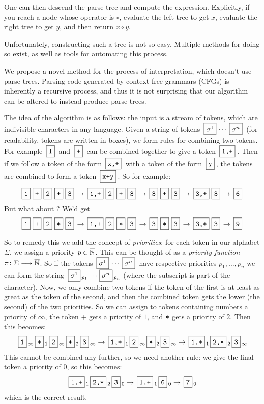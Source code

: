 \documentclass{llncs}
\newcounter{algo}
\begin{document}
One can then descend the parse tree and compute the expression.
Explicitly, if you reach a node whose operator is $\circ$, evaluate the left tree to get $x$, evaluate the right tree to get $y$, and then return $x\circ y$.

Unfortunately, constructing such a tree is not so easy.
Multiple methods for doing so exist, as well as tools for automating this process.

We propose a novel method for the process of interpretation, which doesn't use parse trees.
Parsing code generated by context-free grammars (CFGs) is inherently a recursive process, and thus it is not surprising that our algorithm can be altered to instead produce parse trees.

The idea of the algorithm is as follows: the input is a stream of tokens, which are indivisible characters in any language.
Given a string of tokens $\mb{\sigma^1}\cdots\mb{\sigma^n}$ (for readability, tokens are written in boxes), we form rules for combining two tokens.
For example $\mb{\ttt1}$ and $\mb{\ttt+}$ can be combined together to give a token $\mb{\ttt{1,+}}$.
Then if we follow a token of the form $\mb{\ttt{x,+}}$ with a token of the form $\mb{\ttt y}$, the tokens are combined to form a token $\mb{\ttt{x+y}}$.
So for example:
\[ \mbt{1} \mbt{+} \mbt{2} \mbt{+} \mbt{3} \to \mbt{1,+} \mbt2 \mbt+ \mbt3 \to \mbt{3} \mbt+ \mbt3 \to \mbt{3,+} \mbt3 \to \mbt6 \]
But what about ?
We'd get
\[ \mbt1 \mbt+ \mbt2 \mbt* \mbt3 \to \mbt{1,+} \mbt2 \mbt* \mbt3 \to \mbt3 \mbt* \mbt3 \to \mbt{3,*} \mbt3 \to \mbt9 \]

So to remedy this we add the concept of \textit{priorities}: for each token in our alphabet $\Sigma$, we assign a priority $p\in\overline{\mathbb N}$.
This can be thought of as a \textit{priority function} $\pi\colon\Sigma\longrightarrow\overline{\mathbb N}$.
So if the tokens $\mb{\sigma^1}\cdots\mb{\sigma^n}$ have respective priorities $p_1,\dots,p_n$ we can form the string $\mb{\sigma^1}_{p_1}\cdots\mb{\sigma^n}_{p_n}$ (where the subscript is part of the
character).
Now, we only combine two tokens if the token of the first is at least as great as the token of the second, and then the combined token gets the lower (the second) of the two priorities.
So we can assign to tokens containing numbers a priority of $\infty$, the token \ttt+ gets a priority of $1$, and $\texttt*$ gets a priority of $2$.
Then this becomes:
\[ \mbt1_\infty \mbt+_1 \mbt2_\infty \mbt*_2 \mbt3_\infty \to \mbt{1,+}_1 \mbt2_\infty \mbt*_2 \mbt3_\infty \to \mbt{1,+}_1 \mbt{2,*}_2 \mbt3_\infty \]
This cannot be combined any further, so we need another rule: we give the final token a priority of $0$, so this becomes:
\[ \mbt{1,+}_1 \mbt{2,*}_2 \mbt3_0 \to \mbt{1,+}_1 \mbt{6}_0 \to \mbt{7}_0 \]
which is the correct result.
\end{document}
